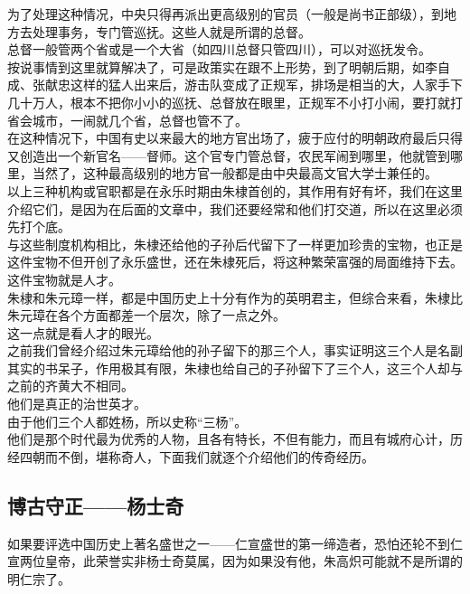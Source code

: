 \begin{multicols}{\theparacolNo}
为了处理这种情况，中央只得再派出更高级别的官员（一般是尚书正部级），到地方去处理事务，专门管巡抚。这些人就是所谓的总督。\\

总督一般管两个省或是一个大省（如四川总督只管四川），可以对巡抚发令。\\

按说事情到这里就算解决了，可是政策实在跟不上形势，到了明朝后期，如李自成、张献忠这样的猛人出来后，游击队变成了正规军，排场是相当的大，人家手下几十万人，根本不把你小小的巡抚、总督放在眼里，正规军不小打小闹，要打就打省会城市，一闹就几个省，总督也管不了。\\

在这种情况下，中国有史以来最大的地方官出场了，疲于应付的明朝政府最后只得又创造出一个新官名——督师。这个官专门管总督，农民军闹到哪里，他就管到哪里，当然了，这种最高级别的地方官一般都是由中央最高文官大学士兼任的。\\

以上三种机构或官职都是在永乐时期由朱棣首创的，其作用有好有坏，我们在这里介绍它们，是因为在后面的文章中，我们还要经常和他们打交道，所以在这里必须先打个底。\\

与这些制度机构相比，朱棣还给他的子孙后代留下了一样更加珍贵的宝物，也正是这件宝物不但开创了永乐盛世，还在朱棣死后，将这种繁荣富强的局面维持下去。\\

这件宝物就是人才。\\

朱棣和朱元璋一样，都是中国历史上十分有作为的英明君主，但综合来看，朱棣比朱元璋在各个方面都差一个层次，除了一点之外。\\

这一点就是看人才的眼光。\\

之前我们曾经介绍过朱元璋给他的孙子留下的那三个人，事实证明这三个人是名副其实的书呆子，作用极其有限，朱棣也给自己的子孙留下了三个人，这三个人却与之前的齐黄大不相同。\\

他们是真正的治世英才。\\

由于他们三个人都姓杨，所以史称“三杨”。\\

他们是那个时代最为优秀的人物，且各有特长，不但有能力，而且有城府心计，历经四朝而不倒，堪称奇人，下面我们就逐个介绍他们的传奇经历。\\

\subsection{博古守正——杨士奇}
如果要评选中国历史上著名盛世之一——仁宣盛世的第一缔造者，恐怕还轮不到仁宣两位皇帝，此荣誉实非杨士奇莫属，因为如果没有他，朱高炽可能就不是所谓的明仁宗了。\\


\end{multicols}
